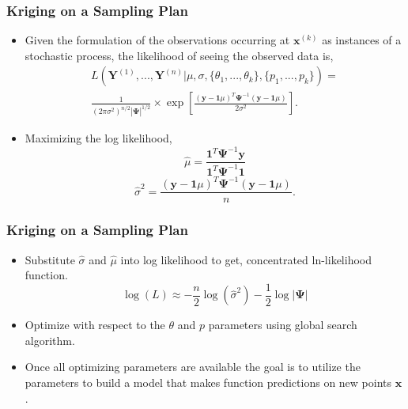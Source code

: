 \documentclass{beamer}
\begin{document}
\begin{frame}
\frametitle{Kriging on a Sampling Plan}

\begin{itemize}
  \item Given the formulation of the observations occurring at $\textbf{x}^{(k)}$ as instances of a stochastic process, the likelihood of seeing the observed data is,
\begin{eqnarray}
   L\left(\textbf{Y}^{(1)}, ..., \textbf{Y}^{(n)} | 
    \mu, \sigma, \lbrace \theta_1,..., \theta_k\rbrace, 
    \lbrace p_1,..., p_k\rbrace\right) = \nonumber \\
     \frac{1}{\left(2\pi\sigma^2\right)^{n/2}|\boldsymbol{\Psi}|^{1/2}}\times
     \exp\left[\frac{  \left(\textbf{y}-\textbf{1}\mu\right)^T
    \boldsymbol{\Psi}^{-1} \left(\textbf{y}-\textbf{1}\mu\right)}
    {2\sigma^2} \right] . \nonumber
\end{eqnarray} 
  \item Maximizing the log likelihood, 
   \begin{equation}
   	\hat{\mu} = \frac{ \textbf{1}^T\boldsymbol{\Psi}^{-1}\textbf{y} }
    		 	    {  \textbf{1}^T\boldsymbol{\Psi}^{-1}\textbf{1} } \nonumber
   \end{equation}
   \begin{equation}
   	\hat{\sigma}^2 = \frac{  \left(\textbf{y}-\textbf{1}\mu\right)^T
    			\boldsymbol{\Psi}^{-1} \left(\textbf{y}-\textbf{1}\mu\right)}{n}. \nonumber
   \end{equation}
\end{itemize}

\end{frame}
\begin{frame}
\frametitle{Kriging on a Sampling Plan}

\begin{itemize}
  \item Substitute $\hat{\sigma}$ and $\hat{\mu}$ into log likelihood to get, concentrated ln-likelihood function.
   \begin{equation}
    \log(L) \approx -\frac{n}{2}\log\left(\hat{\sigma}^2\right) -
     \frac{1}{2} \log|\boldsymbol{\Psi}| \nonumber	
   \end{equation}
  \item Optimize with respect to the $\theta$ and $p$ parameters using global search algorithm.
  \item Once all optimizing parameters are available the goal is to utilize the parameters to build a model that makes function predictions on new points $\textbf{x}$.
\end{itemize}

\end{frame}
\end{document}

